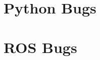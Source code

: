 \newpage{}
\section{Python Bugs} \label{sec:python_bugs}


\newpage{}
\section{ROS Bugs} \label{sec:ros_bugs}



